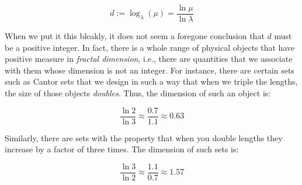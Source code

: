 \documentclass[10pt]{amsart}
\begin{document}
$$d := \log_{\lambda}(\mu) = \frac{\ln \mu}{\ln \lambda}$$

When we put it this bleakly, it does not seem a foregone conclusion
that $d$ must be a positive integer. In fact, there is a whole range
of physical objects that have positive measure in {\em fractal
dimension}, i.e., there are quantities that we associate with them
whose dimension is not an integer. For instance, there are certain
sets such as Cantor sets that we design in such a way that when we
triple the lengths, the size of those objects {\em doubles}. Thus, the
dimension of such an object is:

$$\frac{\ln 2}{\ln 3} \approx \frac{0.7}{1.1} \approx 0.63$$

Similarly, there are sets with the property that when you double
lengths they increase by a factor of three times. The dimension of
such sets is:

$$\frac{\ln 3}{\ln 2} \approx \frac{1.1}{0.7} \approx 1.57$$
\end{document}
